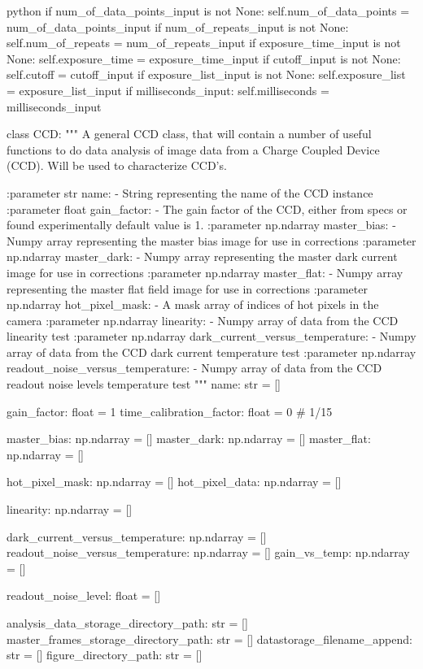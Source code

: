 \documentclass[../main.tex]{subfiles}
\begin{document}
\begin{mintedbox}{python}
if num_of_data_points_input is not None:
self.num_of_data_points  =  num_of_data_points_input
if num_of_repeats_input is not None:
self.num_of_repeats  =  num_of_repeats_input
if exposure_time_input is not None:
self.exposure_time  =  exposure_time_input
if cutoff_input is not None:
self.cutoff  =  cutoff_input
if exposure_list_input is not None:
self.exposure_list  =  exposure_list_input
if milliseconds_input:
self.milliseconds  =  milliseconds_input


class CCD:
"""
A general CCD class, that will contain a number of useful functions to do
data analysis of image data from a Charge Coupled Device (CCD). Will be
used to characterize CCD's.

:parameter str name:
- String representing the name of the CCD instance
:parameter float gain_factor:
- The gain factor of the CCD, either from specs or found experimentally
default value is 1.
:parameter np.ndarray master_bias:
- Numpy array representing the master bias image
for use in corrections
:parameter np.ndarray master_dark:
- Numpy array representing the master dark current image
for use in corrections
:parameter np.ndarray master_flat:
- Numpy array representing the master flat field image
for use in corrections
:parameter np.ndarray hot_pixel_mask:
- A mask array of indices of hot pixels in the camera
:parameter np.ndarray linearity:
- Numpy array of data from the CCD linearity test
:parameter np.ndarray dark_current_versus_temperature:
- Numpy array of data from the CCD dark current temperature test
:parameter np.ndarray readout_noise_versus_temperature:
- Numpy array of data from the CCD readout noise levels temperature test
"""
name: str  =  []

gain_factor: float  =  1
time_calibration_factor: float  =  0  # 1/15

master_bias: np.ndarray  =  []
master_dark: np.ndarray  =  []
master_flat: np.ndarray  =  []

hot_pixel_mask: np.ndarray  =  []
hot_pixel_data: np.ndarray  =  []

linearity: np.ndarray  =  []

dark_current_versus_temperature: np.ndarray  =  []
readout_noise_versus_temperature: np.ndarray  =  []
gain_vs_temp: np.ndarray  =  []

readout_noise_level: float  =  []

analysis_data_storage_directory_path: str  =  []
master_frames_storage_directory_path: str  =  []
datastorage_filename_append: str  =  []
figure_directory_path: str  =  []


\end{mintedbox}
\end{document}
